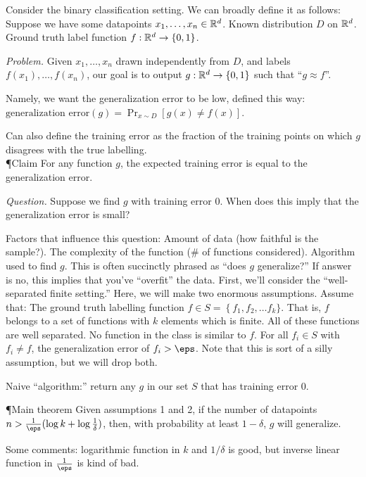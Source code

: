 \documentclass[8pt]{article}
\newlength{\norm}
\newlength{\sm}
\begin{document}
{\begin{multicols*}{5}


Consider the binary classification setting.  We can broadly define it as follows: Suppose we have some datapoints $x_1, \dots, x_n \in \mathbb{R}^d$. Known distribution $D$ on $\mathbb{R}^d$. Ground truth label function $f: \mathbb{R}^d \to \left\{ 0, 1 \right\}$.

{\it Problem.} Given $x_1, \dots, x_n$ drawn independently from $D$, and labels $f(x_1), \dots, f(x_n)$, our goal is to output $g: \mathbb{R}^d \to \left\{ 0, 1 \right\}$ such that ``$g \approx f$''.

Namely, we want the generalization error to be low, defined this way: $\text{generalization error}(g) = \Pr_{x \sim D} \left[ g(x) \neq f(x) \right]$.

Can also define the training error as the fraction of the training points on which $g$ disagrees with the true labelling. \\

\P{Claim} For any function $g$, the expected training error is equal to the generalization error.

{\it Question.} Suppose we find $g$ with training error 0.  When does this imply that the generalization error is small?

Factors that influence this question: Amount of data (how faithful is the sample?). The complexity of the function (\# of functions considered). Algorithm used to find $g$. This is often succinctly phrased as ``does $g$ generalize?''  If answer is no, this implies that you've ``overfit'' the data. First, we'll consider the ``well-separated finite setting.''  Here, we will make two enormous assumptions.  Assume that: The ground truth labelling function $f \in S = \left\{ f_1, f_2, \dots f_k \}$.  That is, $f$ belongs to a set of functions with $k$ elements which is finite. All of these functions are well separated.  No function in the class is similar to $f$.  For all $f_i \in S$ with $f_i \neq f$, the generalization error of $f_i > \eps$.  Note that this is sort of a silly assumption, but we will drop both.

Naive ``algorithm:'' return any $g$ in our set $S$ that has training error 0.

\P{Main theorem} Given assumptions 1 and 2, if the number of datapoints $n > \frac{1}{\eps} (\log k + \log \frac{1}{\delta} )$, then, with probability at least $1 - \delta$, $g$ will generalize.

Some comments: logarithmic function in $k$ and $1/\delta$ is good, but inverse linear function in $\frac{1}{ \eps}$ is kind of bad.


\end{multicols*}}
\end{document}
